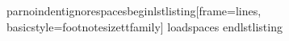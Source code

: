 \markdownRendererDocumentBegin
\markdownRendererBackslash{}par\markdownRendererBackslash{}noindent\markdownRendererBackslash{}ignorespaces\markdownRendererBackslash{}begin\markdownRendererLeftBrace{}lstlisting\markdownRendererRightBrace{}[frame=lines, basicstyle=\markdownRendererBackslash{}footnotesize\markdownRendererBackslash{}ttfamily] \markdownRendererPercentSign{}loadspaces \markdownRendererBackslash{}end\markdownRendererLeftBrace{}lstlisting\markdownRendererRightBrace{}\markdownRendererDocumentEnd